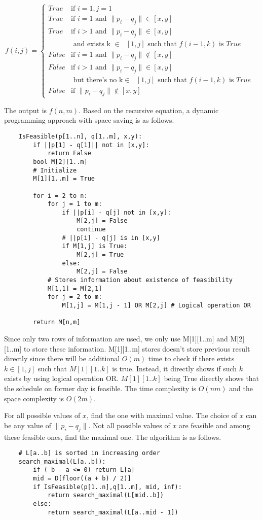 \documentclass[12pt,a4paper]{article}
\newcommand{\question}[1]{\bigskip\noindent{\textbf{Q{#1} solution}}}
\begin{document}
\begin{equation*}
f(i, j) = 
	\begin{cases}
	True & \mbox{if } i = 1, j = 1 \\
	True & \mbox{if } i = 1 \mbox{ and } \|p_i - q_j\| \in [x,y] \\
	True & \mbox{if } i > 1 \mbox{ and }\|p_i - q_j\| \in [x,y] \\
		& \mbox{ and exists k $\in$ $[1,j]$ such that $f(i - 1, k)$ is $True$} \\
	False & \mbox{if } i = 1 \mbox{ and } \|p_i - q_j\| \notin [x,y] \\
	False & \mbox{if }  i > 1 \mbox{ and } \|p_i - q_j\| \in [x,y] \\
		& \mbox{ but there's no k$\in$ $[1,j]$ such that $f(i - 1, k)$ is $True$ } \\
	False & \mbox{if } \|p_i - q_j\| \notin [x,y]
	\end{cases}
\end{equation*}

The output is $f(n, m)$. Based on the recursive equation, a dynamic programming approach with space saving is as follows.

\begin{lstlisting}
	IsFeasible(p[1..n], q[1..m], x,y):
		if ||p[1] - q[1]|| not in [x,y]:
			return False
		bool M[2][1..m] 
		# Initialize
		M[1][1..m] = True

		for i = 2 to n:
			for j = 1 to m:
				if ||p[i] - q[j] not in [x,y]:
					M[2,j] = False
					continue
				# ||p[i] - q[j] is in [x,y]
				if M[1,j] is True:
					M[2,j] = True
				else:
					M[2,j] = False
			# Stores information about existence of feasibility
			M[1,1] = M[2,1]
			for j = 2 to m:
				M[1,j] = M[1,j - 1] OR M[2,j] # Logical operation OR

		return M[n,m]	
\end{lstlisting}

Since only two rows of information are used, we only use M[1][1..m] and M[2][1..m] to store these information. M[1][1..m] stores doesn't store previous result directly since there will be additional $O(m)$ time to check if there exists $k \in [1,j]$ such that $M[1][1..k]$ is true. Instead, it directly shows if such $k$ exists by using logical operation OR. $M[1][1..k]$ being True directly shows that the schedule on former day is feasible. The time complexity is $O(nm)$ and the space complexity is $O(2m)$.

\question{21.B}

For all possible values of $x$, find the one with maximal value. The choice of $x$ can be any value of $\|p_i - q_j\|$. Not all possible values of $x$ are feasible and among these feasible ones, find the maximal one. The algorithm is as follows.
\begin{lstlisting}
	# L[a..b] is sorted in increasing order
	search_maximal(L[a..b]):
		if ( b - a <= 0) return L[a]
		mid = D[floor((a + b) / 2)]
		if IsFeasible(p[1..n],q[1..m], mid, inf):
			return search_maximal(L[mid..b])
		else:
			return search_maximal(L[a..mid - 1])
\end{lstlisting}
\end{document}
